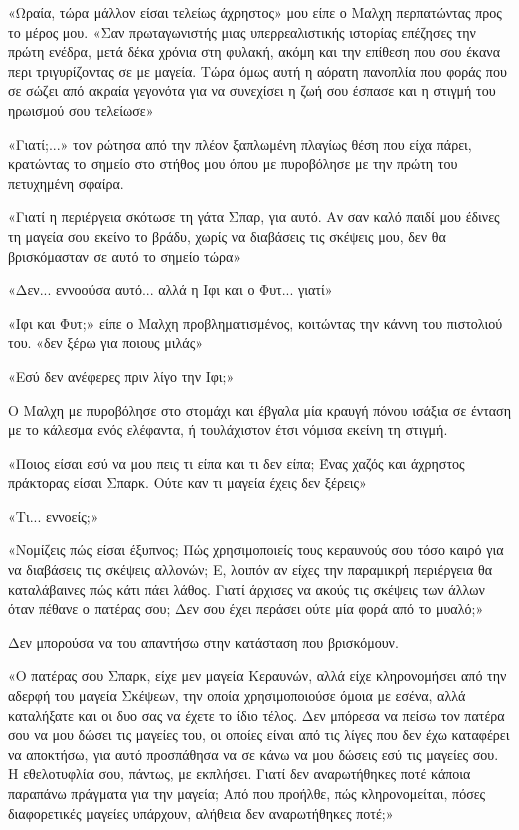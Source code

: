 \documentclass[12pt,twoside, openany]{book}
\begin{document}
«Ωραία, τώρα μάλλον είσαι τελείως άχρηστος» μου είπε ο Μαλχη περπατώντας προς το μέρος μου. «Σαν πρωταγωνιστής μιας υπερρεαλιστικής ιστορίας επέζησες την πρώτη ενέδρα, μετά δέκα χρόνια στη φυλακή, ακόμη και την επίθεση που σου έκανα περι τριγυρίζοντας σε με μαγεία. Τώρα όμως αυτή η αόρατη πανοπλία που φοράς που σε σώζει από ακραία γεγονότα για να συνεχίσει η ζωή σου έσπασε και η στιγμή του ηρωισμού σου τελείωσε»

«Γιατί;...» τον ρώτησα από την πλέον ξαπλωμένη πλαγίως θέση που είχα πάρει, κρατώντας το σημείο στο στήθος μου όπου με πυροβόλησε με την πρώτη του πετυχημένη σφαίρα.

«Γιατί η περιέργεια σκότωσε τη γάτα Σπαρ, για αυτό. Αν σαν καλό παιδί μου έδινες τη μαγεία σου εκείνο το βράδυ, χωρίς να διαβάσεις τις σκέψεις μου, δεν θα βρισκόμασταν σε αυτό το σημείο τώρα»

«Δεν... εννοούσα αυτό... αλλά η Ιφι και ο Φυτ... γιατί»

«Ιφι και Φυτ;» είπε ο Μαλχη προβληματισμένος, κοιτώντας την κάννη του πιστολιού του. «δεν ξέρω για ποιους μιλάς»

«Εσύ δεν ανέφερες πριν λίγο την Ιφι;»

Ο Μαλχη με πυροβόλησε στο στομάχι και έβγαλα μία κραυγή πόνου ισάξια σε ένταση με το κάλεσμα ενός ελέφαντα, ή τουλάχιστον έτσι νόμισα εκείνη τη στιγμή.

«Ποιος είσαι εσύ να μου πεις τι είπα και τι δεν είπα; Ένας χαζός και άχρηστος πράκτορας είσαι Σπαρκ. Ούτε καν τι μαγεία έχεις δεν ξέρεις»

«Τι... εννοείς;»

«Νομίζεις πώς είσαι έξυπνος; Πώς χρησιμοποιείς τους κεραυνούς σου τόσο καιρό για να διαβάσεις τις σκέψεις αλλονών; Ε, λοιπόν αν είχες την παραμικρή περιέργεια θα καταλάβαινες πώς κάτι πάει λάθος. Γιατί άρχισες να ακούς τις σκέψεις των άλλων όταν πέθανε ο πατέρας σου; Δεν σου έχει περάσει ούτε μία φορά από το μυαλό;»

Δεν μπορούσα να του απαντήσω στην κατάσταση που βρισκόμουν.

«Ο πατέρας σου Σπαρκ, είχε μεν μαγεία Κεραυνών, αλλά είχε κληρονομήσει από την αδερφή του μαγεία Σκέψεων, την οποία χρησιμοποιούσε όμοια με εσένα, αλλά καταλήξατε και οι δυο σας να έχετε το ίδιο τέλος. Δεν μπόρεσα να πείσω τον πατέρα σου να μου δώσει τις μαγείες του, οι οποίες είναι από τις λίγες που δεν έχω καταφέρει να αποκτήσω, για αυτό προσπάθησα να σε κάνω να μου δώσεις εσύ τις μαγείες σου. Η εθελοτυφλία σου, πάντως, με εκπλήσει. Γιατί δεν αναρωτήθηκες ποτέ κάποια παραπάνω πράγματα για την μαγεία; Από που προήλθε, πώς κληρονομείται, πόσες διαφορετικές μαγείες υπάρχουν, αλήθεια δεν αναρωτήθηκες ποτέ;»
\end{document}
